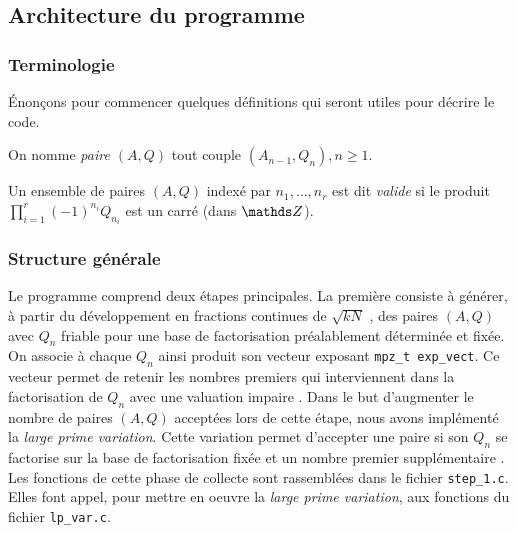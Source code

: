 \subsection{Architecture du programme}

\subsubsection{Terminologie}

Énonçons pour commencer quelques définitions qui seront utiles pour décrire le
code. 

\begin{definition}
	On nomme \emph{paire $(A, Q)$} tout couple $(A_{n-1}, Q_n), n\geq 1$.
\end{definition}

\begin{definition}
	Un ensemble de paires $(A, Q)$ indexé par $n_1, \dots, n_r$ est dit
	\emph{valide} si le produit $\prod_{i=1}^r (-1)^{n_i} Q_{n_i}$ est un carré
	(dans $\Z$).
\end{definition}

\subsubsection{Structure générale}

Le programme comprend deux étapes principales. La première consiste à générer,
à partir du développement en fractions continues de $\sqrt{kN}$ , des paires $(A, Q)$ avec $Q_n$ friable pour une base de factorisation
préalablement déterminée et fixée. On associe à chaque $Q_n$ ainsi produit son
vecteur exposant \texttt{mpz\_t exp\_vect}. Ce vecteur permet de retenir les
nombres premiers qui interviennent dans la factorisation de $Q_n$ avec une
valuation impaire . Dans le but d'augmenter le nombre de paires $(A,Q)$
acceptées lors de cette étape, nous avons implémenté la \textit{large prime
variation}. Cette variation permet d'accepter une paire si son $Q_n$ se
factorise sur la base de factorisation fixée et un nombre premier
supplémentaire . Les
fonctions de cette phase de collecte sont rassemblées dans le fichier
\texttt{step\_1.c}. Elles font appel, pour mettre en oeuvre la \textit{large
prime variation}, aux fonctions du fichier \texttt{lp\_var.c}. \\
 
